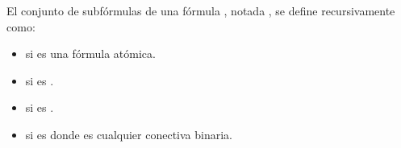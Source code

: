 \begin{isabellebody}
\begin{isamarkuptext}
  \begin{definicion}
  El conjunto de subfórmulas de una fórmula , notada , se 
  define recursivamente como:
    \begin{itemize}
      \item {} si  es una fórmula atómica.
      \item \isa{{\isacharbraceleft}{\isasymbottom}{\isacharbraceright}} si  es \isa{{\isasymbottom}}.
      \item {} si  es .
      \item {} si  es  donde \isa{{\isacharasterisk}} es 
        cualquier conectiva binaria.
    \end{itemize}
  \end{definicion}


\end{isamarkuptext}
\end{isabellebody}
